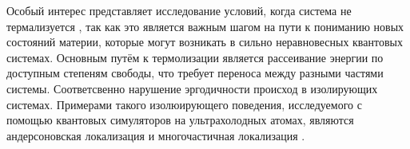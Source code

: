 Особый интерес представляет исследование условий, когда система не термализуется \cite{abanin_colloquium_2019}, так как это является важным шагом на пути к пониманию новых состояний материи, которые могут возникать в сильно неравновесных квантовых системах. Основным путём к термолизации является рассеивание энергии по доступным степеням свободы, что требует переноса между разными частями системы. Соответсвенно нарушение эргодичности происход в изолирующих системах. Примерами такого изолюирующего поведения, исследуемого с помощью квантовых симуляторов на ультрахолодных атомах, являются андерсоновская локализация \cite{roati_anderson_2008} и многочастичная локализация \cite{choi_exploring_2016}.
